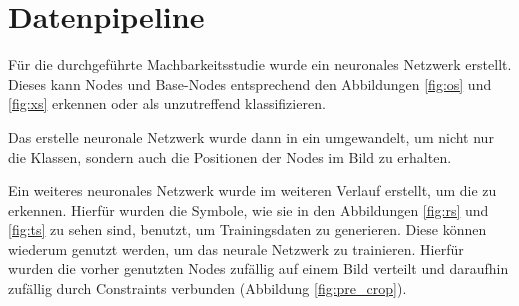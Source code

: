 \section{Datenpipeline}
Für die durchgeführte Machbarkeitsstudie wurde ein neuronales Netzwerk erstellt.
Dieses kann Nodes und Base-Nodes entsprechend den Abbildungen \ref{fig:os} und \ref{fig:xs} erkennen oder als unzutreffend klassifizieren.

Das erstelle neuronale Netzwerk wurde dann in ein  \cite{Long2014} umgewandelt, um nicht nur die Klassen, sondern auch die Positionen der Nodes im Bild zu erhalten.

Ein weiteres neuronales Netzwerk wurde im weiteren Verlauf erstellt, um die  zu erkennen.
Hierfür wurden die Symbole, wie sie in den Abbildungen \ref{fig:rs} und \ref{fig:ts} zu sehen sind, benutzt, um Trainingsdaten zu generieren.
Diese können wiederum genutzt werden, um das neurale Netzwerk zu trainieren.
Hierfür wurden die vorher genutzten Nodes zufällig auf einem Bild verteilt und daraufhin zufällig durch Constraints verbunden (Abbildung \ref{fig:pre_crop}).

